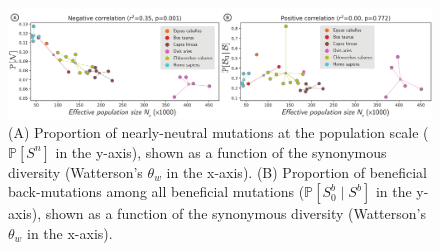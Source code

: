 \documentclass{article}
\newcommand{\proba}{\mathbb{P}}
\newcommand{\Sphy}{S_{0}}
\newcommand{\SphyBen}{\Sphy^{b}}
\newcommand{\given}{\mid}
\newcommand{\Spop}{S}
\newcommand{\SpopNeu}{\Spop^{n}}
\newcommand{\SpopBen}{\Spop^{b}}
\begin{document}

    \begin{figure}[!ht]
        \centering
        \includegraphics[width=\textwidth, page=1] {artworks/figure.diversity}
        \caption{
            (A) Proportion of nearly-neutral mutations at the population scale ($\proba [ \SpopNeu]$ in the y-axis), shown as a function of the synonymous diversity (Watterson's $\theta_w$ in the x-axis).
            (B) Proportion of beneficial back-mutations among all beneficial mutations ($\proba [ \SphyBen  \given  \SpopBen]$ in the y-axis), shown as a function of the synonymous diversity (Watterson's $\theta_w$ in the x-axis).
        }
        \label{fig:diversity}
    \end{figure}
\end{document}
